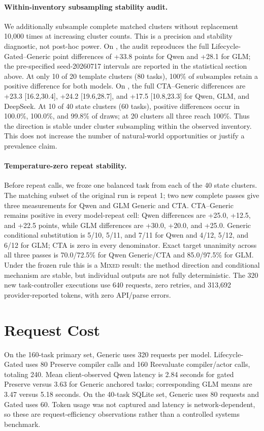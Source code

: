 \documentclass[10pt]{article}
\begin{document}
\paragraph{Within-inventory subsampling stability audit.}
We additionally subsample complete matched clusters without replacement 10,000 times at
increasing cluster counts. This is a precision and stability diagnostic, not post-hoc power.
On \PrimaryDiagnostic{}, the audit reproduces the full Lifecycle-Gated--Generic point differences of +33.8 points
for Qwen and +28.1 for GLM; the pre-specified seed-20260717 intervals are reported in the
statistical section above. At only 10 of 20 template clusters (80 tasks), 100\% of subsamples
retain a positive difference for both models. On \NewSchemaReplication{},
the full CTA--Generic differences are +23.3 [16.2,30.4], +24.2 [19.6,28.7], and +17.5
[10.8,23.3] for Qwen, GLM, and DeepSeek. At 10 of 40 state clusters (60 tasks), positive
differences occur in 100.0\%, 100.0\%, and 99.8\% of draws; at 20 clusters all three reach
100\%. Thus the direction is stable under cluster subsampling within the observed inventory.
This does not increase the number of natural-world opportunities or justify a prevalence claim.

\paragraph{Temperature-zero repeat stability.}
Before repeat calls, we froze one balanced task from each of the 40 \NewSchemaReplication{} state clusters. The matching
subset of the original run is repeat 1; two new complete passes give three measurements for Qwen
and GLM Generic and CTA. CTA--Generic remains positive in every model-repeat cell: Qwen differences
are +25.0, +12.5, and +22.5 points, while GLM differences are +30.0, +20.0, and +25.0. Generic
conditional substitution is 5/10, 5/11, and 7/11 for Qwen and 4/12, 5/12, and 6/12 for GLM; CTA is zero
in every denominator. Exact target unanimity across all three passes is 70.0/72.5\% for Qwen
Generic/CTA and 85.0/97.5\% for GLM. Under the frozen rule this is a \textsc{Mixed} result: the
method direction and conditional mechanism are stable, but individual outputs are not fully
deterministic. The 320 new task-controller executions use 640 requests, zero retries, and 313,692
provider-reported tokens, with zero API/parse errors.

\section{Request Cost}
On the 160-task primary set, Generic uses 320 requests per model. Lifecycle-Gated uses 80
Preserve compiler calls and 160 Reevaluate compiler/actor calls, totaling 240. Mean
client-observed Qwen latency is 2.84 seconds for gated Preserve versus 3.63 for Generic
anchored tasks; corresponding GLM means are 3.47 versus 5.18 seconds. On the 40-task SQLite
set, Generic uses 80 requests and Gated uses 60. Token usage was not captured and latency is
network-dependent, so these are request-efficiency observations rather than a controlled
systems benchmark.
\end{document}
